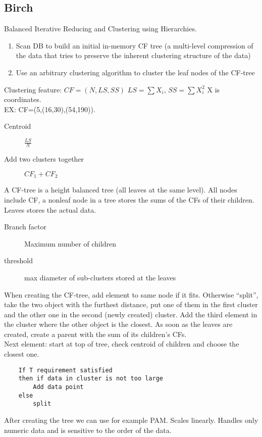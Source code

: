 \documentclass[a4paper]{article}
\begin{document}
\subsection{Birch}
Balanced Iterative Reducing and Clustering using Hierarchies. 
\begin{enumerate}
	\item Scan DB to build an initial in-memory CF tree (a multi-level
		compression of the data that tries to preserve the inherent
		clustering structure of the data)
	\item Use an arbitrary clustering algorithm to cluster the leaf nodes of
		the CF-tree
\end{enumerate}
Clustering feature: $CF=(N,LS,SS)$ $LS=\sum X_i$, $SS=\sum X_i^2$ X is
coordinates.\\
EX: CF=(5,(16,30),(54,190)).
\begin{description}
	\item[Centroid] $\frac{LS}{N}$
	\item[Add two clusters together] $CF_1+CF_2$
\end{description}
A CF-tree is a height balanced tree (all leaves at the same level). All nodes
include CF, a nonleaf node in a tree stores the sums of the CFs of their
children. Leaves stores the actual data.
\begin{description}
	\item[Branch factor] Maximum number of children
	\item[threshold] max diameter of sub-clusters stored at the leaves
\end{description}
When creating the CF-tree, add element to same node if it fits.
Otherwise ``split'', take the two object with the furthest distance, put one of
them in the first cluster and the other one in the second (newly created)
cluster. Add the third element in the cluster where the other object is the
closest.
As soon as the leaves are created, create a parent with the sum of its
children's
CFs. 
\\Next element: start at top of tree, check centroid of children and choose
the closest one.
\begin{lstlisting}
	If T requirement satisfied
	then if data in cluster is not too large
		Add data point
	else
		split
\end{lstlisting}
After creating the tree we can use for example PAM. Scales linearly. Handles
only numeric data and is sensitive to the order of the data.
\end{document}
